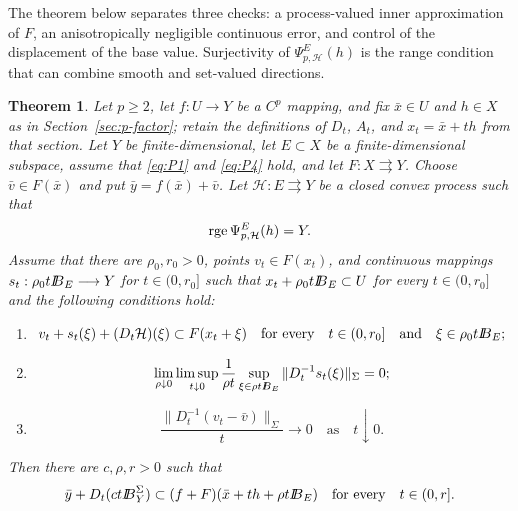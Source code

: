 \documentclass[11pt]{amsart}
\newtheorem{theorem}{Theorem}[section]
\theoremstyle{definition}
\theoremstyle{remark}
\newcommand{\tto}{\rightrightarrows}
\newcommand{\bx}{\bar x}
\newcommand{\by}{\bar y}
\newcommand{\bv}{\bar v}
\newcommand{\rge}{\mathop{\rm rge}\nolimits}
\def\ball{{I\kern -.35em B}}
\begin{document}
	The theorem below separates three checks: a process-valued inner
	approximation of $F$, an anisotropically negligible continuous error, and
	control of the displacement of the base value. Surjectivity of
	$\Psi_{p,\mathcal H}^{E}(h)$ is the range condition that can combine smooth
	and set-valued directions.
	
	\begin{theorem}
		\label{thm:p-process-criterion}
		Let $p\ge2$, let $f:U\longrightarrow Y$ be a $C^p$ mapping, and fix
		$\bx\in U$ and $h\in X$ as in Section~\ref{sec:p-factor}; retain the
		definitions of $D_t$, $A_t$, and $x_t=\bx+th$ from that section. Let $Y$
		be finite-dimensional, let $E\subset X$ be a finite-dimensional subspace,
		assume that \eqref{eq:P1} and \eqref{eq:P4} hold, and let $F:X\tto Y$.
		Choose
		$\bv\in F(\bx)$ and put $\by=f(\bx)+\bv$.  Let
		$\mathcal H:E\tto Y$ be a closed convex process such that
		$$
		\rge\Psi_{p,\mathcal H}^{E}(h)=Y.
		$$
		Assume that there are $\rho_0,r_0>0$, points $v_t\in F(x_t)$, and
		continuous mappings $s_t:\rho_0t\ball_E\longrightarrow Y$ for $t\in(0,r_0]$ such
		that $x_t+\rho_0t\ball_E\subset U$ for every $t\in(0,r_0]$ and the
		following conditions hold:
		\begin{enumerate}[label={\rm (\roman*)}]
			\item
			\begin{equation}
				v_t+s_t(\xi)+(D_t\mathcal H)(\xi)
				\subset F(x_t+\xi)
				\quad\text{for every}\quad t\in(0,r_0]
				\quad\text{and}\quad\xi\in\rho_0t\ball_E;
				\label{eq:process-inner}
			\end{equation}
			\item
			\begin{equation}
				\lim_{\rho\downarrow0}\limsup_{t\downarrow0}
				\frac{1}{\rho t}
				\sup_{\xi\in\rho t\ball_E}
				\|D_t^{-1}s_t(\xi)\|_{\Sigma}=0;
				\label{eq:process-rem}
			\end{equation}
			\item
			\begin{equation}
				\frac{\|D_t^{-1}(v_t-\bv)\|_{\Sigma}}{t}\to0
				\quad\text{as}\quad t\downarrow0.
				\label{eq:process-center}
			\end{equation}
		\end{enumerate}
		Then there are $c,\rho,r>0$ such that
		\begin{equation}
			\by+D_t(ct\ball_Y^{\Sigma})
			\subset(f+F)(\bx+th+\rho t\ball_E)
			\quad\text{for every}\quad t\in(0,r].
			\label{eq:process-cover}
		\end{equation}
	\end{theorem}
	
\end{document}

